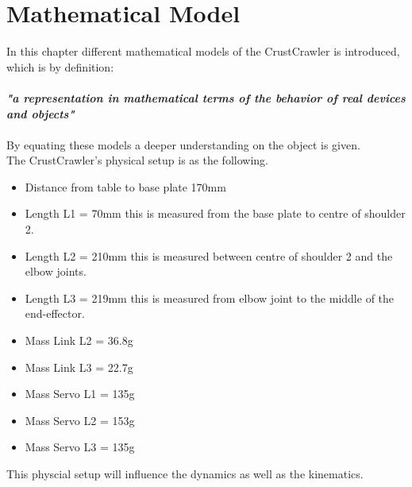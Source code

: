 \chapter{Mathematical Model}\label{ch:MatematicalModel}
In this chapter different mathematical models of the CrustCrawler is introduced, which is by definition:\\\\
\textit{\textbf{"a representation in mathematical terms of the behavior of real devices and objects"}}
\\\\
By equating these models a deeper understanding on the object is given.\\
The CrustCrawler's physical setup is as the following.
\begin{itemize}
    \item Distance from table to base plate 170mm
    \item Length L1 = 70mm  this is measured from the base plate to centre of shoulder 2.
    \item Length L2 = 210mm this is measured between centre of shoulder 2 and the elbow joints.
    \item Length L3 = 219mm this is measured from elbow joint to the middle of the end-effector.
    
    \item Mass Link  L2 = 36.8g
    \item Mass Link  L3 = 22.7g 
    
    
    \item Mass Servo L1 = 135g
    \item Mass Servo L2 = 153g
    \item Mass Servo L3 = 135g
\end{itemize}

This physcial setup will influence the dynamics as well as the kinematics.


